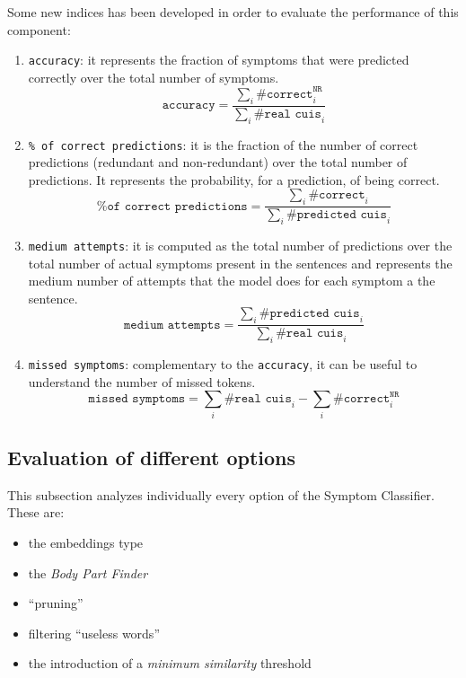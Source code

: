 Some new indices has been developed in order to evaluate the performance of this component:
\begin{enumerate}

  \item \texttt{accuracy}: it represents the fraction of symptoms that were predicted correctly over the total number of symptoms.
  \begin{equation}
  \texttt{accuracy} = \frac{\sum_{i}{\texttt{\#correct}_{i}^{\texttt{NR}}}}{\sum_{i}{\texttt{\#real cuis}_{i}}}
  \end{equation}

  \item \texttt{\% of correct predictions}: it is the fraction of the number of correct predictions (redundant and non-redundant) over the total number of predictions. It represents the probability, for a prediction, of being correct.
  \begin{equation}
  \texttt{\% of correct predictions} = \frac{\sum_{i}{\texttt{\#correct}_{i}}}{\sum_{i}{\texttt{\#predicted cuis}_{i}}}
  \end{equation}

  \item \texttt{medium attempts}: it is computed as the total number of predictions over the total number of actual symptoms present in the sentences and represents the medium number of attempts that the model does for each symptom a the sentence.
  \begin{equation}
  \texttt{medium attempts} = \frac{\sum_{i}{\texttt{\#predicted cuis}_{i}}}{\sum_{i}{\texttt{\#real cuis}_{i}}}
  \end{equation}

  \item \texttt{missed symptoms}: complementary to the \texttt{accuracy}, it can be useful to understand the number of missed tokens.
  \begin{equation}
  \texttt{missed symptoms} = \sum_{i}{\texttt{\#real cuis}_{i}} - \sum_{i}{\texttt{\#correct}^{\texttt{NR}}_{i}}
  \end{equation}

\end{enumerate}

\newpage
\subsection{Evaluation of different options}
\label{sec:evaluationoptions}
This subsection analyzes individually every option of the Symptom Classifier. These are: 
\begin{itemize}
  \item the embeddings type
  \item the \textit{Body Part Finder}
  \item ``pruning''
  \item filtering ``useless words''
  \item the introduction of a \textit{minimum similarity} threshold
\end{itemize}

